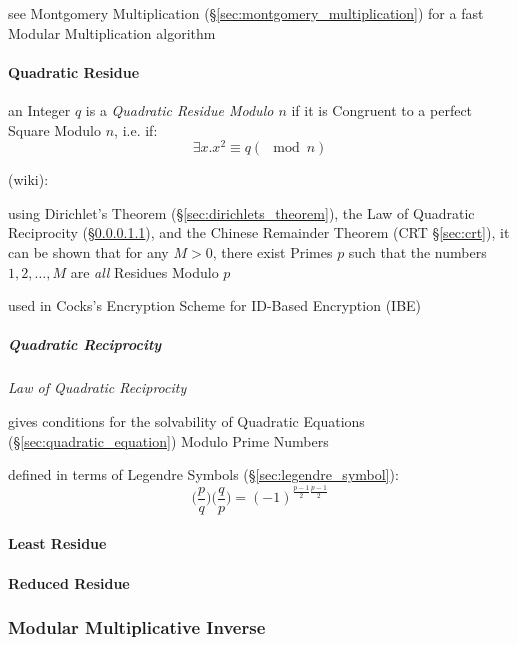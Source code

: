 \fist see Montgomery Multiplication (\S\ref{sec:montgomery_multiplication}) for
a fast Modular Multiplication algorithm



\paragraph{Quadratic Residue}\label{sec:quadratic_residue}\hfill

an Integer $q$ is a \emph{Quadratic Residue Modulo $n$} if it is Congruent to
a perfect Square Modulo $n$, i.e. if:
\[
  \exists x . x^2 \equiv q (\mod n)
\]

(wiki):

using Dirichlet's Theorem (\S\ref{sec:dirichlets_theorem}), the Law of Quadratic
Reciprocity (\S\ref{sec:quadratic_reciprocity}), and the Chinese Remainder
Theorem (CRT \S\ref{sec:crt}), it can be shown that for any $M > 0$, there exist
Primes $p$ such that the numbers $1, 2, \ldots, M$ are \emph{all} Residues
Modulo $p$

used in Cocks's Encryption Scheme for ID-Based Encryption (IBE)



\subparagraph{Quadratic Reciprocity}\label{sec:quadratic_reciprocity}\hfill

\emph{Law of Quadratic Reciprocity}

gives conditions for the solvability of Quadratic Equations
(\S\ref{sec:quadratic_equation}) Modulo Prime Numbers

defined in terms of Legendre Symbols (\S\ref{sec:legendre_symbol}):
\[
  \Big(\frac{p}{q}\Big) \Big(\frac{q}{p}\Big) =
    (-1)^{\frac{p-1}{2}\frac{p-1}{2}}
\]



\paragraph{Least Residue}\label{sec:least_residue}\hfill

\paragraph{Reduced Residue}\label{sec:reduced_residue}\hfill



\subsubsection{Modular Multiplicative Inverse}\label{sec:modular_inverse}

